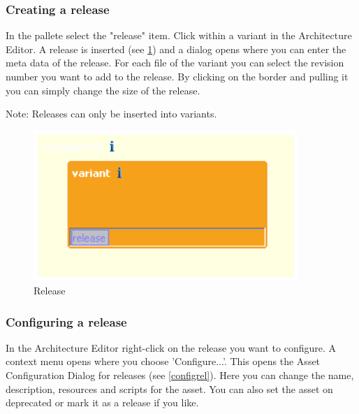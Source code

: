 \subsubsection{Creating a release}

In the pallete select the "release" item. Click within a variant in 
the Architecture Editor. A release is inserted (see \ref{release}) and a dialog opens where you can enter the meta data of
the release. For each file of the variant you can select the revision number you want to add to the release. 
By clicking on the border and pulling it you can simply change the size of the release. \par
Note: Releases can only be inserted into variants.

\begin{figure}[h!]
\begin{center}
\includegraphics[width=10cm]{release.png}
   \caption{Release}
\label{release}
\end{center}
\end{figure}\par


\subsubsection{Configuring a release}
In the Architecture Editor right-click on the release you want to configure. 
A context menu opens where you choose 'Configure...'. This opens the Asset Configuration Dialog
for releases (see \ref{configrel}). Here you can change the name, description, resources and scripts for the
asset. You can also set the asset on deprecated or mark it as a release if you like.

